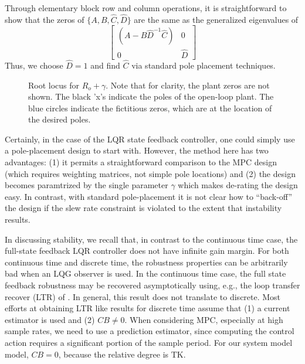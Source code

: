 \documentclass[journal,twocolumn,twoside]{IEEEtran}
\begin{document}
Through elementary block row and column operations, it is straightforward to show that the zeros of
$\{A, B, \hat C, \hat D\}$ are the same as the generalized eigenvalues of
\begin{equation}
  \begin{bmatrix}
    (A - B\hat{D}^{-1}\hat{C}) & 0\\
    0 & \hat{D}
  \end{bmatrix}
\end{equation}
Thus, we choose $\hat D = 1$ and find $\hat C$ via standard pole placement techniques.

\begin{figure}
  
  \caption{Root locus for $R_o + \gamma$. Note that for clarity, the plant zeros are not shown. The black 'x's indicate the poles of the open-loop plant. The blue circles indicate the fictitious zeros, which are at the location of the desired poles. }
  \label{fig:lqr_locus}
\end{figure}

Certainly, in the case of the LQR state feedback controller, one could simply use a pole-placement design to start with. However, the method here has two advantages: (1) it permits a straightforward comparison to the MPC design (which requires weighting matrices, not simple pole locations) and (2) the design becomes paramtrized by the single parameter $\gamma$ which makes de-rating the design easy. In contrast, with standard pole-placement it is not clear how to ``back-off'' the design if the slew rate constraint is violated to the extent that instability results. 


In discussing stability, we recall that, in contrast to the continuous time case, the full-state feedback LQR controller does not have infinite gain margin. For both continuous time and discrete time, the robustness properties can be arbitrarily bad when an LQG observer is used. In the continuous time case, the full state feedback robustness may be recovered asymptotically using, e.g., the loop transfer recover (LTR) of \cite{doyle_guaranteed_1978}. In general, this result does not translate to discrete. Most efforts at obtaining LTR like results for discrete time assume that (1) a current estimator is used and (2) $CB\neq 0$. When considering MPC, especially at high sample rates, we need to use a prediction estimator, since computing the control action requires a significant portion of the sample period. For our system model model, $CB=0$, because the relative degree is TK. 
\end{document}
